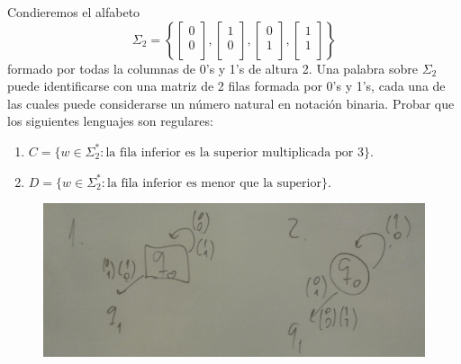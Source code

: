 \documentclass[twoside]{article}
\begin{document}
\begin{ejercicio}{9}
Condieremos el alfabeto
$$\Sigma_2 = \left\{\begin{bmatrix}
0\\
0\\
\end{bmatrix},\begin{bmatrix}
1\\
0\\
\end{bmatrix},\begin{bmatrix}
0\\
1\\
\end{bmatrix},\begin{bmatrix}
1\\
1\\
\end{bmatrix}\right\}$$
formado por todas la columnas de 0's y 1's de altura 2. Una palabra sobre $\Sigma_2$ puede identificarse
con una matriz de 2 filas formada por 0's y 1's, cada una de las cuales puede considerarse un
número natural en notación binaria. Probar que los siguientes lenguajes son regulares:
\begin{enumerate}
\item $C = \{w \in \Sigma^*_2
: \text{la fila inferior es la superior multiplicada por } 3\}$. 
\item $D = \{w \in \Sigma^*_2
: \text{la fila inferior es menor que la superior}\}$.  
\end{enumerate}
\end{ejercicio}
\begin{solucion}


\begin{figure}[h!]
\includegraphics[scale=0.1]{Automatas/9}
\end{figure}\
\end{solucion}
\newpage
\end{document}
